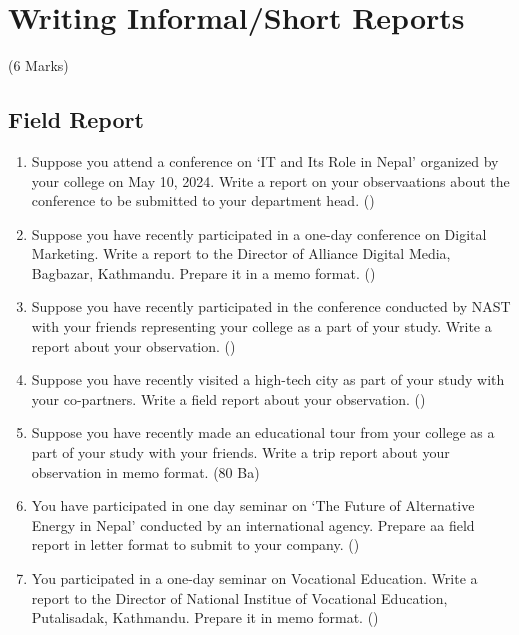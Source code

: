 \documentclass[12pt]{article}
\begin{document}
\section{Writing Informal/Short Reports}
  \begin{center}(6 Marks)\end{center}
  
  \subsection{Field Report}
    \begin{enumerate}
      \item Suppose you attend a conference on `IT and Its Role in Nepal' organized by your college on May 10, 2024. Write a report on your observaations about the conference to be submitted to your department head. \hfill ()

      \item Suppose you have recently participated in a one-day conference on Digital Marketing. Write a report to the Director of Alliance Digital Media, Bagbazar, Kathmandu. Prepare it in a memo format. \hfill ()

      \item Suppose you have recently participated in the conference conducted by NAST with your friends representing your college as a part of your study. Write a report about your observation. \hfill ()
      
      \item Suppose you have recently visited a high-tech city as part of your study with your co-partners. Write a field report about your observation. \hfill ()

      \item Suppose you have recently made an educational tour from your college as a part of your study with your friends. Write a trip report about your observation in memo format. \hfill (80 Ba)

      \item You have participated in one day seminar on `The Future of Alternative Energy in Nepal' conducted by an international agency. Prepare aa field report in letter format to submit to your company. \hfill ()

      \item You participated in a one-day seminar on Vocational Education. Write a report to the Director of National Institue of Vocational Education, Putalisadak, Kathmandu. Prepare it in memo format. \hfill ()
    \end{enumerate}
\end{document}
